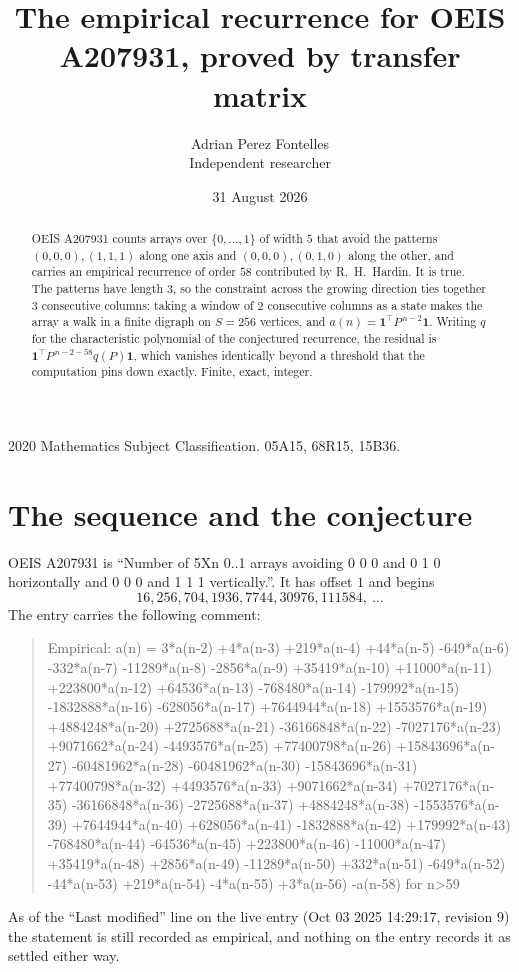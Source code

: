 \documentclass[11pt,a4paper]{article}
\title{The empirical recurrence for OEIS A207931, proved by transfer matrix}
\author{Adrian Perez Fontelles\\ \small Independent researcher}
\date{31 August 2026}
\theoremstyle{plain}
\theoremstyle{definition}
\begin{document}
\maketitle

\begin{abstract}
OEIS A207931 counts arrays over $\{0,\dots,1\}$ of width $5$ that avoid the patterns
$(0,0,0), (1,1,1)$ along one axis and $(0,0,0), (0,1,0)$ along the other, and carries an empirical recurrence of
order $58$ contributed by R.~H.~Hardin. It is true. The patterns have length $3$, so
the constraint across the growing direction ties together $3$ consecutive columns: taking a
window of $2$ consecutive columns as a state makes the array a walk in a finite digraph
on $S=256$ vertices, and $a(n)=\mathbf{1}^{\!\top}P^{\,n-2}\mathbf{1}$. Writing $q$
for the characteristic polynomial of the conjectured recurrence, the residual is
$\mathbf{1}^{\!\top}P^{\,n-2-58}q(P)\mathbf{1}$, which vanishes identically
beyond a threshold that the computation pins down exactly. Finite, exact, integer.
\end{abstract}

\noindent\small 2020 Mathematics Subject Classification. 05A15, 68R15, 15B36.\normalsize

\section{The sequence and the conjecture}

OEIS A207931 is ``Number of 5Xn 0..1 arrays avoiding 0 0 0 and 0 1 0 horizontally and 0 0 0 and 1 1 1 vertically.''. It has offset
$1$ and begins
\[
16, 256, 704, 1936, 7744, 30976, 111584,\ \dots
\]
The entry carries the following comment:
\begin{quote}\small
Empirical: a(n) = 3*a(n-2) +4*a(n-3) +219*a(n-4) +44*a(n-5) -649*a(n-6) -332*a(n-7) -11289*a(n-8) -2856*a(n-9) +35419*a(n-10) +11000*a(n-11) +223800*a(n-12) +64536*a(n-13) -768480*a(n-14) -179992*a(n-15) -1832888*a(n-16) -628056*a(n-17) +7644944*a(n-18) +1553576*a(n-19) +4884248*a(n-20) +2725688*a(n-21) -36166848*a(n-22) -7027176*a(n-23) +9071662*a(n-24) -4493576*a(n-25) +77400798*a(n-26) +15843696*a(n-27) -60481962*a(n-28) -60481962*a(n-30) -15843696*a(n-31) +77400798*a(n-32) +4493576*a(n-33) +9071662*a(n-34) +7027176*a(n-35) -36166848*a(n-36) -2725688*a(n-37) +4884248*a(n-38) -1553576*a(n-39) +7644944*a(n-40) +628056*a(n-41) -1832888*a(n-42) +179992*a(n-43) -768480*a(n-44) -64536*a(n-45) +223800*a(n-46) -11000*a(n-47) +35419*a(n-48) +2856*a(n-49) -11289*a(n-50) +332*a(n-51) -649*a(n-52) -44*a(n-53) +219*a(n-54) -4*a(n-55) +3*a(n-56) -a(n-58) for n>59
\end{quote}
As of the ``Last modified'' line on the live entry (Oct 03 2025 14:29:17, revision
9) the statement is still recorded as empirical, and nothing on the entry
records it as settled either way.
\end{document}
